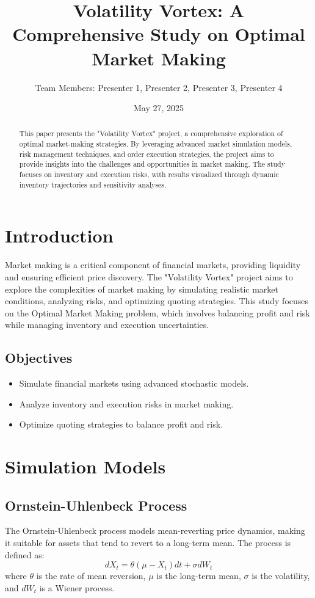 \documentclass[12pt]{article}
\title{Volatility Vortex: A Comprehensive Study on Optimal Market Making}
\author{Team Members: Presenter 1, Presenter 2, Presenter 3, Presenter 4}
\date{May 27, 2025}
\begin{document}
\maketitle

\begin{abstract}
This paper presents the "Volatility Vortex" project, a comprehensive exploration of optimal market-making strategies. By leveraging advanced market simulation models, risk management techniques, and order execution strategies, the project aims to provide insights into the challenges and opportunities in market making. The study focuses on inventory and execution risks, with results visualized through dynamic inventory trajectories and sensitivity analyses.
\end{abstract}

\section{Introduction}
Market making is a critical component of financial markets, providing liquidity and ensuring efficient price discovery. The "Volatility Vortex" project aims to explore the complexities of market making by simulating realistic market conditions, analyzing risks, and optimizing quoting strategies. This study focuses on the Optimal Market Making problem, which involves balancing profit and risk while managing inventory and execution uncertainties.

\subsection{Objectives}
\begin{itemize}
    \item Simulate financial markets using advanced stochastic models.
    \item Analyze inventory and execution risks in market making.
    \item Optimize quoting strategies to balance profit and risk.
\end{itemize}

\section{Simulation Models}
\subsection{Ornstein-Uhlenbeck Process}
The Ornstein-Uhlenbeck process models mean-reverting price dynamics, making it suitable for assets that tend to revert to a long-term mean. The process is defined as:
\begin{equation}
    dX_t = \theta(\mu - X_t)dt + \sigma dW_t
\end{equation}
where $\theta$ is the rate of mean reversion, $\mu$ is the long-term mean, $\sigma$ is the volatility, and $dW_t$ is a Wiener process.
\end{document}
